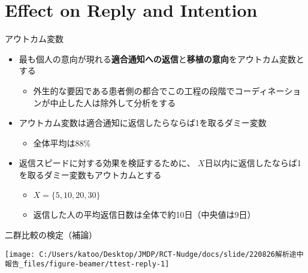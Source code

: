 \documentclass[
      aspectratio=169,
        12pt,
    ]{beamer}
\renewcommand{\textbf}[1]{{\color{DarkBlue}\bfseries#1}}
\providecommand{\tightlist}{%
  \setlength{\itemsep}{0pt}\setlength{\parskip}{0pt}}
\begin{document}
\hypertarget{effect-on-reply-and-intention}{%
\section{Effect on Reply and Intention}\label{effect-on-reply-and-intention}}

\begin{frame}{アウトカム変数}
\protect\hypertarget{ux30a2ux30a6ux30c8ux30abux30e0ux5909ux6570}{}
\begin{itemize}
\tightlist
\item
  最も個人の意向が現れる\textbf{適合通知への返信}と\textbf{移植の意向}をアウトカム変数とする

  \begin{itemize}
  \tightlist
  \item
    外生的な要因である患者側の都合でこの工程の段階でコーディネーションが中止した人は除外して分析をする
  \end{itemize}
\item
  アウトカム変数は適合通知に返信したらならば1を取るダミー変数

  \begin{itemize}
  \tightlist
  \item
    全体平均は88\%
  \end{itemize}
\item
  返信スピードに対する効果を検証するために、
  \(X\)日以内に返信したならば1を取るダミー変数もアウトカムとする

  \begin{itemize}
  \tightlist
  \item
    \(X = \{5, 10, 20, 30\}\)
  \item
    返信した人の平均返信日数は全体で約10日（中央値は9日）
  \end{itemize}
\end{itemize}
\end{frame}

\begin{frame}{二群比較の検定（補論）}
\protect\hypertarget{ux4e8cux7fa4ux6bd4ux8f03ux306eux691cux5b9aux88dcux8ad6}{}
\begin{center}\texttt{[image: C:/Users/katoo/Desktop/JMDP/RCT-Nudge/docs/slide/220826解析途中報告\_files/figure-beamer/ttest-reply-1]} \end{center}
\end{frame}
\end{document}
